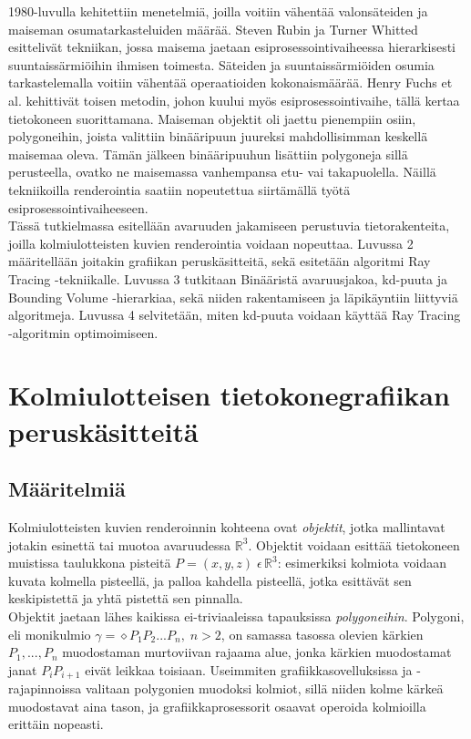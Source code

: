 \documentclass[a4paper,12pt, titlepage]{article}
\theoremstyle{break}
\newcommand{\R}{\mathbb{R}}
\begin{document}
1980-luvulla kehitettiin menetelmiä, joilla voitiin vähentää valonsäteiden ja maiseman osumatarkasteluiden määrää. Steven Rubin ja Turner Whitted esittelivät tekniikan, jossa maisema jaetaan esiprosessointivaiheessa hierarkisesti suuntaissärmiöihin ihmisen toimesta. Säteiden ja suuntaissärmiöiden osumia tarkastelemalla voitiin vähentää operaatioiden kokonaismäärää.\cite{rubin} Henry Fuchs et al. kehittivät toisen metodin, johon kuului myös esiprosessointivaihe, tällä kertaa tietokoneen suorittamana. Maiseman objektit oli jaettu pienempiin osiin, polygoneihin, joista valittiin binääripuun juureksi mahdollisimman keskellä maisemaa oleva. Tämän jälkeen binääripuuhun lisättiin polygoneja sillä perusteella, ovatko ne maisemassa vanhempansa etu- vai takapuolella. Näillä tekniikoilla renderointia saatiin nopeutettua siirtämällä työtä esiprosessointivaiheeseen.\cite{fuchs}  \\

Tässä tutkielmassa esitellään avaruuden jakamiseen perustuvia tietorakenteita, joilla kolmiulotteisten kuvien renderointia voidaan nopeuttaa. Luvussa 2 määritellään joitakin grafiikan peruskäsitteitä, sekä esitetään algoritmi Ray Tracing -tekniikalle. Luvussa 3 tutkitaan Binääristä avaruusjakoa, kd-puuta ja Bounding Volume -hierarkiaa, sekä niiden rakentamiseen ja läpikäyntiin liittyviä algoritmeja. Luvussa 4 selvitetään, miten kd-puuta voidaan käyttää Ray Tracing -algoritmin optimoimiseen.


\newpage
\section{Kolmiulotteisen tietokonegrafiikan peruskäsitteitä}
\subsection{Määritelmiä}

Kolmiulotteisten kuvien renderoinnin kohteena ovat \emph{objektit}, jotka mallintavat jotakin esinettä tai muotoa avaruudessa $\R^3$. Objektit voidaan esittää tietokoneen muistissa taulukkona pisteitä $P=(x,y,z)\;\epsilon\,\R^3$: esimerkiksi kolmiota voidaan kuvata kolmella pisteellä, ja palloa kahdella pisteellä, jotka esittävät sen keskipistettä ja yhtä pistettä sen pinnalla.\cite{angel}\\

Objektit jaetaan lähes kaikissa ei-triviaaleissa tapauksissa \emph{polygoneihin}. Polygoni, eli monikulmio $\gamma = \diamond P_1P_2...P_n, \; n > 2$, on samassa tasossa olevien kärkien $P_1,...,P_n$ muodostaman murtoviivan rajaama alue, jonka kärkien muodostamat janat $P_i P_{i+1}$ eivät leikkaa toisiaan.\cite{harju} Useimmiten grafiikkasovelluksissa ja -rajapinnoissa valitaan polygonien muodoksi kolmiot, sillä niiden kolme kärkeä muodostavat aina tason, ja grafiikkaprosessorit osaavat operoida kolmioilla erittäin nopeasti.\cite{angel}\\
\end{document}
